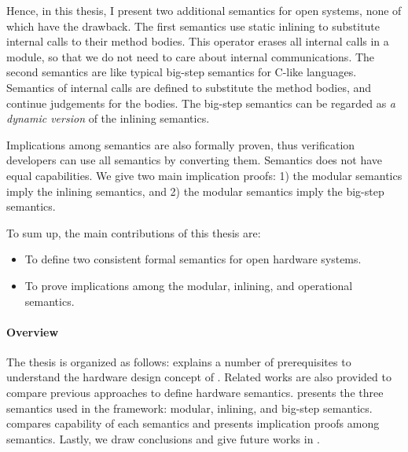 Hence, in this thesis, I present two additional semantics for open
systems, none of which have the drawback. The first semantics use
static inlining to substitute internal calls to their method
bodies. This operator erases all internal calls in a module, so that
we do not need to care about internal communications. The second
semantics are like typical big-step semantics for C-like
languages. Semantics of internal calls are defined to substitute the
method bodies, and continue judgements for the bodies. The big-step
semantics can be regarded as \emph{a dynamic version} of the inlining
semantics.

Implications among semantics are also formally proven, thus
verification developers can use all semantics by converting
them. Semantics does not have equal capabilities. We give two main
implication proofs: 1) the modular semantics imply the inlining
semantics, and 2) the modular semantics imply the big-step semantics.

To sum up, the main contributions of this thesis are:
\begin{itemize}
\item To define two consistent formal semantics for open hardware
  systems.
\item To prove implications among the modular, inlining, and
  operational semantics.
\end{itemize}

\paragraph{Overview}

The thesis is organized as follows: 
explains a number of prerequisites to understand the hardware design
concept of \Bluespec{}. Related works are also provided to compare
previous approaches to define hardware
semantics.  presents the three semantics used
in the \Kami{} framework: modular, inlining, and big-step
semantics.  compares capability of each
semantics and presents implication proofs among semantics. Lastly, we
draw conclusions and give future works in .





